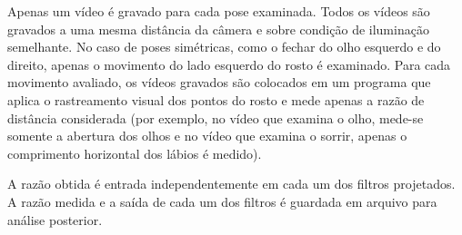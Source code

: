 Apenas um vídeo é gravado para cada pose examinada. Todos os vídeos são gravados
a uma mesma distância da câmera e sobre condição de iluminação semelhante. No
caso de poses simétricas, como o fechar do olho esquerdo e do direito, apenas o
movimento do lado esquerdo do rosto é examinado. Para cada movimento avaliado,
os vídeos gravados são colocados em um programa que aplica o rastreamento visual
dos pontos do rosto e mede apenas a razão de distância considerada (por exemplo,
no vídeo que examina o olho, mede-se somente a abertura dos olhos e no vídeo que
examina o sorrir, apenas o comprimento horizontal dos lábios é medido). 

A razão obtida é entrada independentemente em cada um dos filtros projetados. A
razão medida e a saída de cada um dos filtros é guardada em arquivo para análise
posterior.

